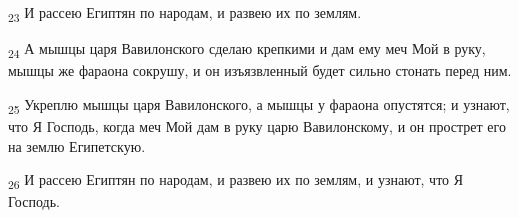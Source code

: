 \begin{tcolorbox}
\textsubscript{23} И рассею Египтян по народам, и развею их по землям.
\end{tcolorbox}
\begin{tcolorbox}
\textsubscript{24} А мышцы царя Вавилонского сделаю крепкими и дам ему меч Мой в руку, мышцы же фараона сокрушу, и он изъязвленный будет сильно стонать перед ним.
\end{tcolorbox}
\begin{tcolorbox}
\textsubscript{25} Укреплю мышцы царя Вавилонского, а мышцы у фараона опустятся; и узнают, что Я Господь, когда меч Мой дам в руку царю Вавилонскому, и он прострет его на землю Египетскую.
\end{tcolorbox}
\begin{tcolorbox}
\textsubscript{26} И рассею Египтян по народам, и развею их по землям, и узнают, что Я Господь.
\end{tcolorbox}
